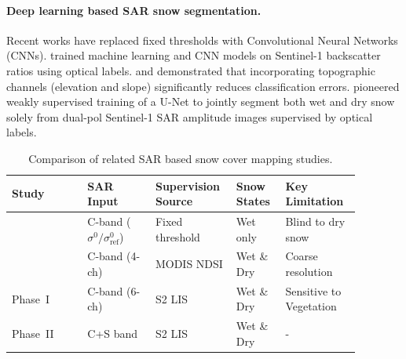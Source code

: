 \documentclass{article}
\begin{document}
\paragraph{Deep learning based SAR snow segmentation.}
Recent works have replaced fixed thresholds with Convolutional Neural Networks (CNNs). \citet{le2023deep} trained machine learning and CNN models on Sentinel-1 backscatter ratios using optical labels. \citet{gallet2024wet} and \citet{daudt2023snow} demonstrated that incorporating topographic channels (elevation and slope) significantly reduces classification errors. \citet{briand2026weakly} pioneered weakly supervised training of a U-Net to jointly segment both wet and dry snow solely from dual-pol Sentinel-1 SAR amplitude images supervised by optical labels.

\begin{table}[!htbp]
  \caption{Comparison of related SAR based snow cover mapping studies.}
  \label{tab:lit_comparison}
  \centering
  \small
  \setlength{\tabcolsep}{4pt}
  \begin{tabular}{p{0.20\linewidth}p{0.18\linewidth}p{0.18\linewidth}p{0.13\linewidth}p{0.19\linewidth}}
    \toprule
    Study & SAR Input & Supervision Source & Snow States & Key Limitation \\
    \midrule
    \citet{nagler2016advancements} & C-band ($\sigma^0/\sigma^0_{\text{ref}}$) & Fixed threshold & Wet only & Blind to dry snow \\
    \citet{briand2026weakly} & C-band (4-ch) & MODIS NDSI & Wet \& Dry & Coarse resolution \\
    {Phase~I} & {C-band (6-ch)} & {S2 LIS} & {Wet \& Dry} & Sensitive to Vegetation \\
    {Phase~II} & {C+S band} & {S2 LIS} & {Wet \& Dry} & - \\
    \bottomrule
  \end{tabular}
\end{table}
\end{document}
